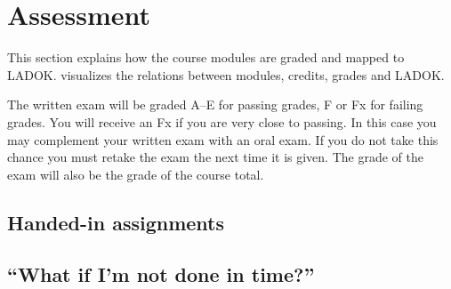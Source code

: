 \section{Assessment}%
\label{Assessment}


This section explains how the course modules are graded and mapped to LADOK\@.
 visualizes the relations between modules, credits, grades and 
LADOK\@.

\begin{frame}
  
\end{frame}

The written exam will be graded A--E for passing grades, F or Fx for failing 
grades.
You will receive an Fx if you are very close to passing.
In this case you may complement your written exam with an oral exam.
If you do not take this chance you must retake the exam the next 
time it is given.
The grade of the exam will also be the grade of the course total.

\subsection{Handed-in assignments}


\subsection{\enquote{What if I'm not done in time?}}%
\label{sec:late}



\printbibliography{}
